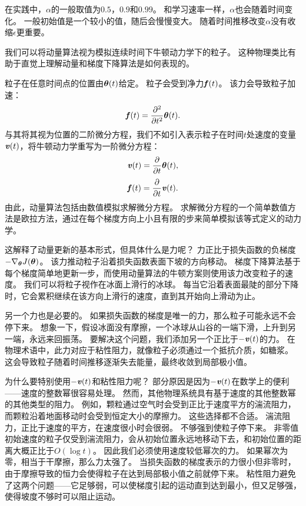 
在实践中，$\alpha$的一般取值为$0.5$，$0.9$和$0.99$。
和学习速率一样，$\alpha$也会随着时间变化。 
一般初始值是一个较小的值，随后会慢慢变大。
随着时间推移改变$\alpha$没有收缩$\epsilon$更重要。

我们可以将动量算法视为模拟连续时间下牛顿动力学下的粒子。
这种物理类比有助于直觉上理解动量和梯度下降算法是如何表现的。

粒子在任意时间点的位置由$\boldsymbol{\theta}(t)$给定。
粒子会受到净力$\boldsymbol{\mathit{f}}(t)$。
该力会导致粒子加速：
\begin{equation}
    \boldsymbol{\mathit{f}}(t) = \frac{\partial^2}{\partial t^2} \boldsymbol{\theta}(t) .
\end{equation}
与其将其视为位置的二阶微分方程，我们不如引入表示粒子在时间$t$处速度的变量$\boldsymbol{\mathit{v}}(t)$，将牛顿动力学重写为一阶微分方程：
\begin{equation}
    \boldsymbol{\mathit{v}}(t) = \frac{\partial}{\partial t} \boldsymbol{\theta}(t) ,
\end{equation}
\begin{equation}
    \boldsymbol{\mathit{f}}(t) = \frac{\partial}{\partial t} \boldsymbol{\mathit{v}}(t) .
\end{equation}
由此，动量算法包括由数值模拟求解微分方程。
求解微分方程的一个简单数值方法是欧拉方法，通过在每个梯度方向上小且有限的步来简单模拟该等式定义的动力学。

这解释了动量更新的基本形式，但具体什么是力呢？
力正比于损失函数的负梯度$-\nabla_{\boldsymbol{\theta}} J(\boldsymbol{\theta})$。
该力推动粒子沿着损失函数表面下坡的方向移动。
梯度下降算法基于每个梯度简单地更新一步，而使用动量算法的牛顿方案则使用该力改变粒子的速度。
我们可以将粒子视作在冰面上滑行的冰球。
每当它沿着表面最陡的部分下降时，它会累积继续在该方向上滑行的速度，直到其开始向上滑动为止。


另一个力也是必要的。
如果损失函数的梯度是唯一的力，那么粒子可能永远不会停下来。
想象一下，假设冰面没有摩擦，一个冰球从山谷的一端下滑，上升到另一端，永远来回振荡。
要解决这个问题，我们添加另一个正比于$-\boldsymbol{\mathit{v}}(t)$的力。
在物理术语中，此力对应于粘性阻力，就像粒子必须通过一个抵抗介质，如糖浆。
这会导致粒子随着时间推移逐渐失去能量，最终收敛到局部极小值。

为什么要特别使用$-\boldsymbol{\mathit{v}}(t)$和粘性阻力呢？
部分原因是因为$-\boldsymbol{\mathit{v}}(t)$在数学上的便利——速度的整数幂很容易处理。
然而，其他物理系统具有基于速度的其他整数幂的其他类型的阻力。
例如，颗粒通过空气时会受到正比于速度平方的湍流阻力，而颗粒沿着地面移动时会受到恒定大小的摩擦力。
这些选择都不合适。
湍流阻力，正比于速度的平方，在速度很小时会很弱。
不够强到使粒子停下来。
非零值初始速度的粒子仅受到湍流阻力，会从初始位置永远地移动下去，和初始位置的距离大概正比于$O(\log t)$。
因此我们必须使用速度较低幂次的力。
如果幂次为零，相当于干摩擦，那么力太强了。
当损失函数的梯度表示的力很小但非零时，由于摩擦导致的恒力会使得粒子在达到局部极小值之前就停下来。
粘性阻力避免了这两个问题——它足够弱，可以使梯度引起的运动直到达到最小，但又足够强，使得坡度不够时可以阻止运动。

